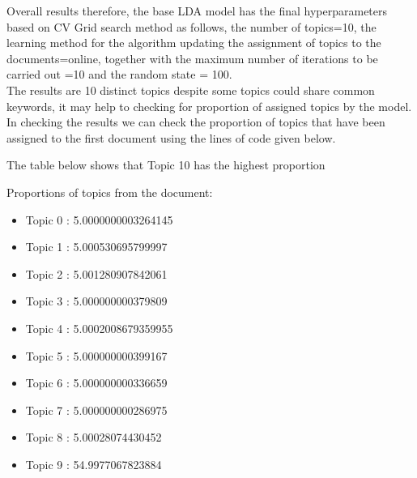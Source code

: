 Overall results therefore, the base LDA model has the final hyperparameters based on CV Grid search method as follows, the number of topics=10, the learning method for the algorithm updating the assignment of topics to the documents=online, together with the maximum number of iterations to be carried out =10 and the random state = 100.\\
The results are 10 distinct topics despite some topics could share common keywords, it may help to checking for proportion of assigned topics by the model.  In checking the results we can check the proportion of topics that have been assigned to the first document using the lines of code given below.

The table below shows that Topic 10 has the highest proportion

Proportions of topics from the document:\\
\begin{itemize}
    \item Topic  0 :  5.0000000003264145 %
\end{itemize}
\begin{itemize}
    \item Topic  1 :  5.000530695799997 %
\end{itemize}
\begin{itemize}
    \item Topic  2 :  5.001280907842061 %
\end{itemize}
\begin{itemize}
    \item Topic  3 :  5.000000000379809 %
\end{itemize}
\begin{itemize}
    \item Topic  4 :  5.0002008679359955 %
\end{itemize}
\begin{itemize}
    \item Topic  5 :  5.000000000399167 %
\end{itemize}
\begin{itemize}
    \item Topic  6 :  5.000000000336659 %
\end{itemize}
\begin{itemize}
    \item Topic  7 :  5.000000000286975 %
\end{itemize}
\begin{itemize}
    \item Topic  8 :  5.00028074430452 %
\end{itemize}
\begin{itemize}
    \item Topic  9 :  54.9977067823884 %
\end{itemize}

